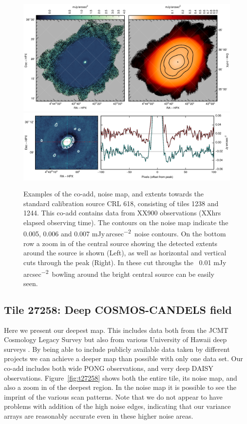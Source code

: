 \documentclass[twocolumn,times]{aastex6}
\newcommand{\jyas}{Jy\,arcsec\textsuperscript{$-$2}}
\begin{document}
\begin{figure}
  \centering
  \includegraphics{crl618-whole-map.pdf}
  \\[3mm]
  \includegraphics{crl618-sourceonly.pdf}
  \caption{Examples of the co-add, noise map, and extents towards the
    standard calibration source CRL 618, consisting of tiles 1238 and
    1244. This co-add contains data from XX900 observations (XXhrs
    elapsed observing time). The contours on the noise map indicate
    the 0.005, 0.006 and 0.007 m\jyas\ noise contours. On the bottom
    row a zoom in of the central source showing the detected extents
    around the source is shown (Left), as well as horizontal and
    vertical cuts through the peak (Right). In these cut throughs the
    ~0.01 m\jyas\ bowling around the bright central source can be
    easily seen. }
  \label{fig:crl618}
\end{figure}

\subsection{Tile 27258: Deep COSMOS-CANDELS field}
Here we present our deepest map. This includes data both from the JCMT
Cosmology Legacy Survey \citep[recently published in][]{Geach2016} but
also from various University of Hawaii deep surveys
\citep{Casey2013,Chen2013,Chen2013a}. By being able to include
publicly available data taken by different projects we can achieve a
deeper map than possible with only one data set. Our co-add includes
both wide PONG observations, and very deep DAISY
observations. Figure~\ref{fig:t27258} shows both the entire tile, its
noise map, and also a zoom in of the deepest region. In the noise map
it is possible to see the imprint of the various scan patterns. Note
that we do not appear to have problems with addition of the high noise
edges, indicating that our variance arrays are reasonably accurate
even in these higher noise areas.
\end{document}
